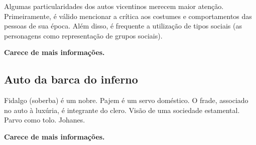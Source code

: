 Algumas particularidades dos autos vicentinos merecem maior atenção. Primeiramente, é válido mencionar a crítica aos costumes e comportamentos das pessoas de sua época. Além disso, é frequente a utilização de tipos sociais (as personagens como representação de grupos sociais).

\textbf{Carece de mais informações.}

\subsection{Auto da barca do inferno}
Fidalgo (soberba) é um nobre. Pajem é um servo doméstico. O frade, associado no auto à luxúria, é integrante do clero. Visão de uma sociedade estamental. Parvo como tolo. Johanes.

\textbf{Carece de mais informações.}